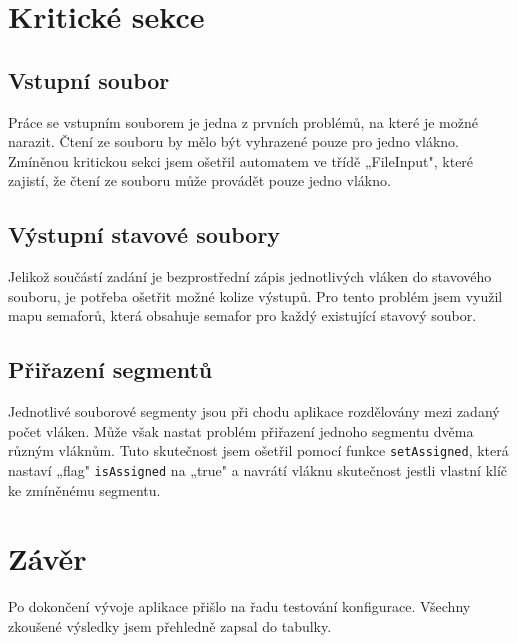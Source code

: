 \documentclass[ 12pt, a4paper]{article}
\begin{document}
\newpage


\section{Kritické sekce}

\subsection{Vstupní soubor}
Práce se vstupním souborem je jedna z prvních problémů, na které je možné narazit. Čtení ze souboru by mělo být vyhrazené pouze pro jedno vlákno. Zmíněnou kritickou sekci jsem ošetřil automatem ve třídě „FileInput", které zajistí, že čtení ze souboru může provádět pouze jedno vlákno.

\subsection{Výstupní stavové soubory}
Jelikož součástí zadání je bezprostřední zápis jednotlivých vláken do stavového souboru, je potřeba ošetřit možné kolize výstupů. Pro tento problém jsem využil mapu semaforů, která obsahuje semafor pro každý existující stavový soubor.


\subsection{Přiřazení segmentů}
Jednotlivé souborové segmenty jsou při chodu aplikace rozdělovány mezi zadaný počet vláken. Může však nastat problém přiřazení jednoho segmentu dvěma různým vláknům. Tuto skutečnost jsem ošetřil pomocí funkce \texttt{setAssigned}, která nastaví „flag" \texttt{isAssigned} na „true" a navrátí vláknu skutečnost jestli vlastní klíč ke zmíněnému segmentu. 

\newpage

\section{Závěr}

Po dokončení vývoje aplikace přišlo na řadu testování konfigurace. Všechny zkoušené výsledky jsem přehledně zapsal do tabulky.
\end{document}
